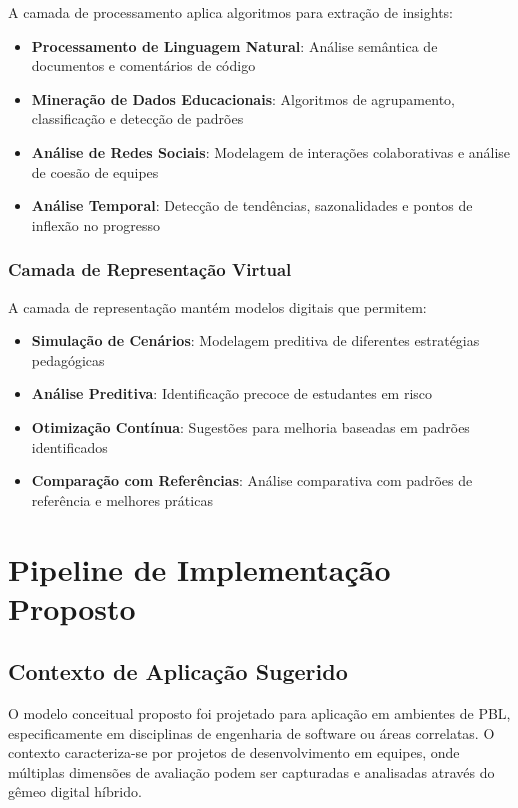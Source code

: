 \documentclass[english, spanish, brazilian]{modelo_dt}
\begin{document}
A camada de processamento aplica algoritmos para extração de insights:
\begin{itemize}
  \item \textbf{Processamento de Linguagem Natural}: Análise semântica de documentos e comentários de código
  \item \textbf{Mineração de Dados Educacionais}: Algoritmos de agrupamento, classificação e detecção de padrões
  \item \textbf{Análise de Redes Sociais}: Modelagem de interações colaborativas e análise de coesão de equipes
  \item \textbf{Análise Temporal}: Detecção de tendências, sazonalidades e pontos de inflexão no progresso
\end{itemize}

\subsubsection{Camada de Representação Virtual}

A camada de representação mantém modelos digitais que permitem:
\begin{itemize}
  \item \textbf{Simulação de Cenários}: Modelagem preditiva de diferentes estratégias pedagógicas
  \item \textbf{Análise Preditiva}: Identificação precoce de estudantes em risco
  \item \textbf{Otimização Contínua}: Sugestões para melhoria baseadas em padrões identificados
  \item \textbf{Comparação com Referências}: Análise comparativa com padrões de referência e melhores práticas
\end{itemize}

\section{Pipeline de Implementação Proposto}

\subsection{Contexto de Aplicação Sugerido}

O modelo conceitual proposto foi projetado para aplicação em ambientes de PBL,
especificamente em disciplinas de engenharia de software ou áreas correlatas. O
contexto caracteriza-se por projetos de desenvolvimento em equipes, onde
múltiplas dimensões de avaliação podem ser capturadas e analisadas através do
gêmeo digital híbrido.
\end{document}
